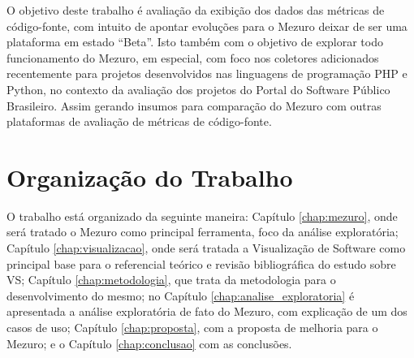 O objetivo deste trabalho é avaliação da exibição dos dados das métricas de
código-fonte, com intuito de apontar evoluções para o Mezuro deixar de ser uma
plataforma em estado ``Beta''.
%
Isto também com o objetivo de explorar todo funcionamento do Mezuro, em especial,
com foco nos coletores adicionados recentemente para projetos desenvolvidos nas
linguagens de programação PHP e Python, no contexto da avaliação dos projetos do
Portal do Software Público Brasileiro.
%
Assim gerando insumos para comparação do Mezuro com outras plataformas de
avaliação de métricas de código-fonte.

\section{Organização do Trabalho}

O trabalho está organizado da seguinte maneira: Capítulo \ref{chap:mezuro}, onde
será tratado o Mezuro como principal ferramenta, foco da análise exploratória;
Capítulo \ref{chap:visualizacao}, onde será tratada a Visualização de Software
como principal base para o referencial teórico e revisão bibliográfica do estudo
sobre VS; Capítulo \ref{chap:metodologia}, que trata da metodologia para o
desenvolvimento do mesmo; no Capítulo \ref{chap:analise_exploratoria} é
apresentada a análise exploratória de fato do Mezuro, com explicação de um dos
casos de uso; Capítulo \ref{chap:proposta}, com a proposta de melhoria para o
Mezuro; e o Capítulo \ref{chap:conclusao} com as conclusões.
